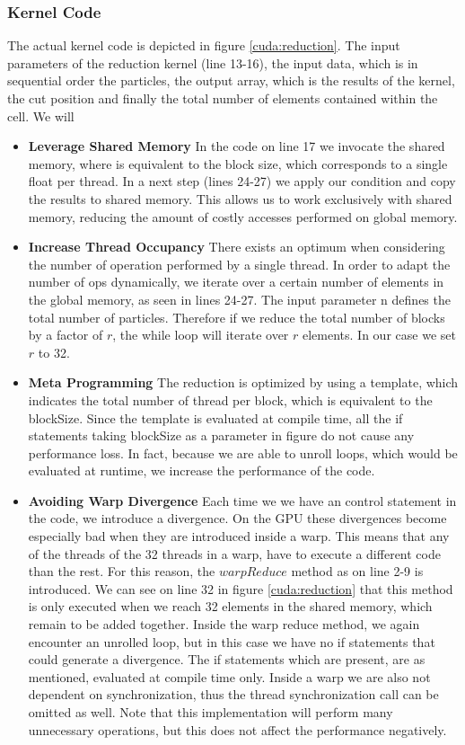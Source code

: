 \documentclass[]{article}
\begin{document}
\subsubsection{Kernel Code}
The actual kernel code is depicted in figure \ref{cuda:reduction}. The input parameters of the reduction kernel (line 13-16), the input data, which is in sequential order the particles, the output array, which is the results of the kernel, the cut position and finally the total number of elements contained within the cell. 
We will 
\begin{itemize}
	\item \textbf{Leverage Shared Memory} 
	In the code on line 17 we invocate the shared memory, where is equivalent to the block size, which corresponds to a single float per thread. In a next step (lines 24-27) we apply our condition and copy the results to shared memory. This allows us to work exclusively with shared memory, reducing the amount of costly accesses performed on global memory.
	
	\item \textbf{Increase Thread Occupancy} There exists an optimum when considering the number of operation performed by a single thread. In order to adapt the number of ops dynamically, we iterate over a certain number of elements in the global memory, as seen in lines 24-27. The input parameter n defines the total number of particles. Therefore if we reduce the total number of blocks by a factor of $r$, the while loop will iterate over $r$ elements. In our case we set $r$ to 32. 
	
	\item \textbf{Meta Programming} The reduction is optimized by using a template, which indicates the total number of thread per block, which is equivalent to the blockSize. Since the template is evaluated at compile time, all the if statements taking blockSize as a parameter in figure do not cause any performance loss. In fact, because we are able to unroll loops, which would be evaluated at runtime, we increase the performance of the code. 
	
	\item \textbf{Avoiding Warp Divergence} Each time we we have an control statement in the code, we introduce a divergence. On the GPU these divergences become especially bad when they are introduced inside a warp. This means that any of the threads of the 32 threads in a warp, have to execute a different code than the rest. For this reason, the $warpReduce$ method as on line 2-9 is introduced. We can see on line 32 in figure \ref{cuda:reduction} that this method is only executed when we reach 32 elements in the shared memory, which remain to be added together. Inside the warp reduce method, we again encounter an unrolled loop, but in this case we have no if statements that could generate a divergence. The if statements which are present, are as mentioned, evaluated at compile time only. Inside a warp we are also not dependent on synchronization, thus the thread synchronization call can be omitted as well. Note that this implementation will perform many unnecessary operations, but this does not affect the performance negatively.
	
\end{itemize}
\end{document}

